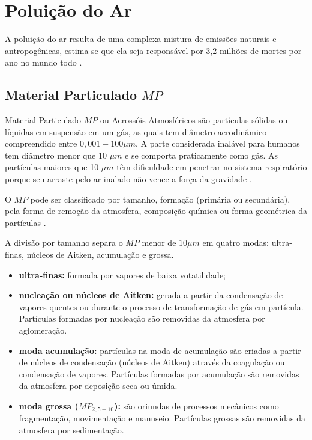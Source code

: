 \section{Poluição do Ar}

A poluição do ar resulta de uma complexa mistura de emissões naturais e 
antropogênicas, estima-se que ela seja responsável por 3,2 milhões de mortes 
por ano no mundo todo \citep{lim2013}. 


\subsection{Material Particulado $MP$}

Material Particulado $MP$ ou Aerossóis Atmosféricos são partículas
sólidas ou líquidas em suspensão em um gás, as quais tem diâmetro 
aerodinâmico compreendido  entre $0,001-100\mu m$. 
A parte considerada inalável para humanos tem diâmetro menor que 10 $\mu m$
e se comporta praticamente como gás.
As partículas maiores que 10 $\mu m$ têm dificuldade em penetrar 
no sistema respiratório porque seu arraste pelo ar inalado não vence 
a força da gravidade \citep{seinfeld1998}.

O $MP$ pode ser classificado por tamanho, formação 
(primária ou secundária), pela forma de remoção da atmosfera, 
composição química ou forma geométrica da partículas \citep{seinfeld1998}.

A divisão por tamanho separa o $MP$ menor de $10 \mu m$ em quatro modas:
ultra-finas, núcleos de Aitken, acumulação e grossa. 

\begin{itemize}
  \item \textbf{ultra-finas:} formada por vapores de baixa votatilidade;
  \item \textbf{nucleação ou núcleos de Aitken:} 
        gerada a partir da condensação de vapores quentes ou durante o processo de 
        transformação de gás em partícula. Partículas formadas por 
        nucleação são removidas da atmosfera por aglomeração.   
  \item \textbf{moda acumulação:} 
         partículas na moda de acumulação são criadas 
         a partir de núcleos de condensação (núcleos de Aitken) através da 
         coagulação ou condensação de vapores. 
         Partículas formadas por acumulação
         são removidas da atmosfera por deposição seca ou úmida.
  \item \textbf{moda grossa ($MP_{2,5-10}$):} 
        são oriundas de processos mecânicos como fragmentação, 
        movimentação e manuseio. Partículas grossas são removidas da atmosfera 
        por sedimentação.
\end{itemize}

